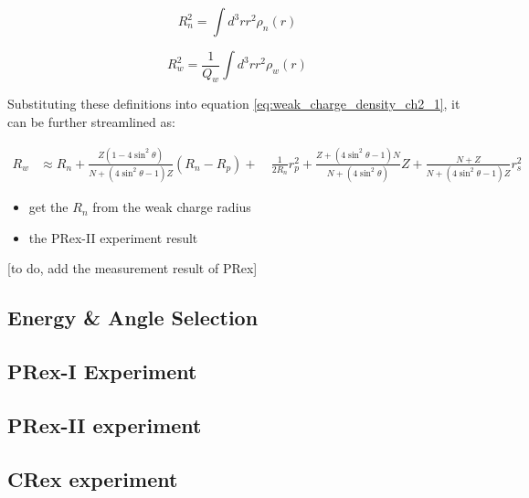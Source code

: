 \begin{equation}
R^2_n = \int d^3rr^2\rho_n(r)
\end{equation}

\begin{equation}
R^2_w = \frac{1}{Q_w}\int d^3rr^2\rho_w(r)
\end{equation}

Substituting these definitions into equation \ref{eq:weak_charge_density_ch2_1}, it can be further streamlined as:

\begin{equation}
\begin{split}
R_w & \approx R_n + \frac{Z(1-4\sin^2{\theta})}{N + (4\sin^2{\theta} -1)Z}(R_n - R_p) + \
& \frac{1}{2R_n}{r_p^2 + \frac{Z + (4\sin^2{\theta} - 1)N}{N + (4\sin^2{\theta})}Z + \frac{N + Z}{N + (4\sin^2{\theta} -1 )Z}r_s^2}
\end{split}
\end{equation}

\begin{itemize}
    \item get the $R_n$ from the weak charge radius
    \item the PRex-II experiment result 
    
\end{itemize}


[to do, add the measurement result of PRex]
\subsection{Energy \& Angle Selection}


\subsection{PRex-I Experiment}
\subsection{PRex-II experiment}
\subsection{CRex experiment}




